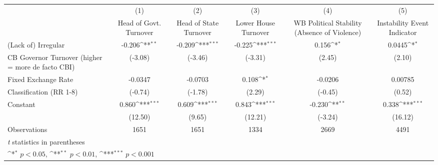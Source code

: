 {
\def\sym#1{\ifmmode^{#1}\else\(^{#1}\)\fi}
\begin{tabular}{l*{5}{c}}
\hline\hline
                    &\multicolumn{1}{c}{(1)}&\multicolumn{1}{c}{(2)}&\multicolumn{1}{c}{(3)}&\multicolumn{1}{c}{(4)}&\multicolumn{1}{c}{(5)}\\
                    &\multicolumn{1}{c}{Head of Govt. Turnover}&\multicolumn{1}{c}{Head of State Turnover}&\multicolumn{1}{c}{Lower House Turnover}&\multicolumn{1}{c}{WB Political Stability (Absence of Violence)}&\multicolumn{1}{c}{Instability Event Indicator}\\
\hline
(Lack of) Irregular &      -0.206\sym{**} &      -0.209\sym{***}&      -0.225\sym{***}&       0.156\sym{*}  &      0.0445\sym{*}  \\
CB Governor Turnover (higher = more de facto CBI)&     (-3.08)         &     (-3.46)         &     (-3.31)         &      (2.45)         &      (2.10)         \\
[1em]
Fixed Exchange Rate &     -0.0347         &     -0.0703         &       0.108\sym{*}  &     -0.0206         &     0.00785         \\
Classification (RR 1-8)&     (-0.74)         &     (-1.78)         &      (2.29)         &     (-0.45)         &      (0.52)         \\
[1em]
Constant            &       0.860\sym{***}&       0.609\sym{***}&       0.843\sym{***}&      -0.230\sym{**} &       0.338\sym{***}\\
                    &     (12.50)         &      (9.65)         &     (12.21)         &     (-3.24)         &     (16.12)         \\
\hline
Observations        &        1651         &        1651         &        1334         &        2669         &        4491         \\
\hline\hline
\multicolumn{6}{l}{\footnotesize \textit{t} statistics in parentheses}\\
\multicolumn{6}{l}{\footnotesize \sym{*} \(p<0.05\), \sym{**} \(p<0.01\), \sym{***} \(p<0.001\)}\\
\end{tabular}
}
